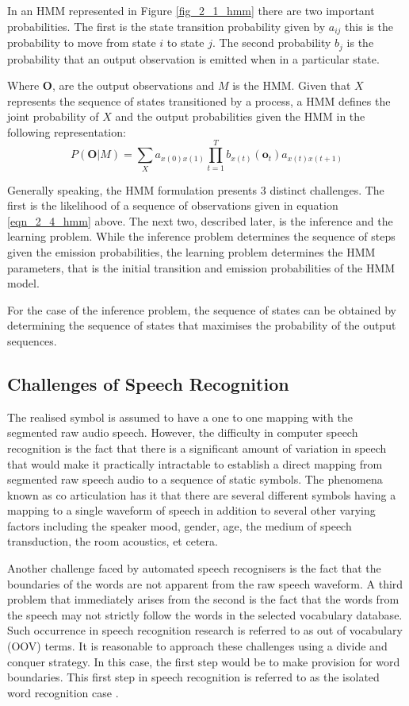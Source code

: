 In an HMM represented in Figure \ref{fig_2_1_hmm} there are two important probabilities.  The first is the state transition probability given by $a_{ij}$ this is the probability to move from state $i$ to state $j$.  The second probability $b_j$ is the probability that an output observation is emitted when in a particular state.

Where $\mathbf{O}$, are the output observations and $M$ is the HMM.  Given that $X$ represents the sequence of states transitioned by a process, a HMM defines the joint probability of $X$ and the output probabilities given the HMM in the following representation:
\begin{equation}P(\mathbf{O}|M)=\sum_Xa_{x(0)x(1)}\prod_{t=1}^Tb_{x(t)}(\mathbf{o}_t)a_{x(t)x(t+1)}
\label{eqn_2_4_hmm}
\end{equation}

Generally speaking, the HMM formulation presents 3 distinct challenges.  The first is the likelihood of a sequence of observations given in equation \ref{eqn_2_4_hmm} above.  The next two,  described later, is the inference and the learning problem.  While the inference problem determines the sequence of steps given the emission probabilities, the learning problem determines the HMM parameters, that is the initial transition and emission probabilities of the HMM model.

For the case of the inference problem, the sequence of states can be obtained by determining the sequence of states that maximises the probability of the output sequences.

\subsection{Challenges of Speech Recognition}
The realised symbol is assumed to have a one to one mapping with the segmented raw audio speech. However, the difficulty in computer speech recognition is the fact that there is a significant amount of variation in speech that would make it practically intractable to establish a direct mapping from segmented raw speech audio to a sequence of static symbols. The phenomena known as co articulation has it that there are several different symbols having a mapping to a single waveform of speech in addition to several other varying factors including the speaker mood, gender, age, the medium of speech transduction, the room acoustics, et cetera.

Another challenge faced by automated speech recognisers is the fact that the boundaries of the words are not apparent from the raw speech waveform. A third problem that immediately arises from the second is the fact that the words from the speech may not strictly follow the words in the selected vocabulary database.  Such occurrence in speech recognition research is referred to as out of vocabulary (OOV) terms.  It is reasonable to approach these challenges using a divide and conquer strategy.  In this case, the first step would be to make provision for word boundaries.  This first step in speech recognition is referred to as the isolated word recognition case \citep{young2002htk}.

